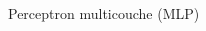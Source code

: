 \documentclass[french]{beamer}
\begin{document}
\begin{frame}{Perceptron multicouche (MLP)}
\begin{columns}[T]
\begin{column}{.52\textwidth}

\end{column}
\end{columns}
\end{frame}
\end{document}
